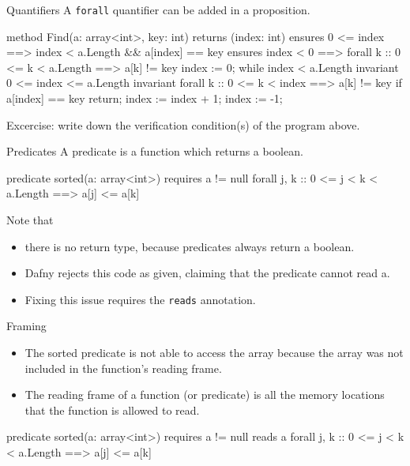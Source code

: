 \documentclass[10pt, compress]{beamer}
\begin{document}
\begin{frame}[fragile]{Quantifiers}
  A \verb|forall| quantifier can be added in a proposition.

  \begin{verbnobox}[\scriptsize]
method Find(a: array<int>, key: int) returns (index: int)
   ensures 0 <= index ==> index < a.Length && a[index] == key
   ensures index < 0 ==> forall k :: 0 <= k < a.Length ==> a[k] != key
{
   index := 0;
   while index < a.Length
      invariant 0 <= index <= a.Length
      invariant forall k :: 0 <= k < index ==> a[k] != key
   {
      if a[index] == key { return; }
      index := index + 1;
   }
   index := -1;
}
  \end{verbnobox}
  Excercise: write down the verification condition(s) of the program above.
\end{frame}

\begin{frame}[fragile]{Predicates}
  A predicate is a function which returns a boolean. 
  \begin{verbnobox}[\footnotesize]
predicate sorted(a: array<int>)
   requires a != null
{
   forall j, k :: 0 <= j < k < a.Length ==> a[j] <= a[k]
}
  \end{verbnobox}
Note that
  \begin{itemize}
  \item there is no return type, because predicates always return a boolean.
  \item Dafny rejects this code as given, claiming that the predicate cannot read a.
  \item Fixing this issue requires the \verb|reads| annotation.
  \end{itemize}
\end{frame}

\begin{frame}[fragile]{Framing}
  \begin{itemize}
  \item The sorted predicate is not able to access the array because the array was not included in the function's reading frame.
  \item The reading frame of a function (or predicate) is all the memory locations that the function is allowed to read. 
  \end{itemize}
  \begin{verbnobox}[\footnotesize]
predicate sorted(a: array<int>)
   requires a != null
   reads a
{
   forall j, k :: 0 <= j < k < a.Length ==> a[j] <= a[k]
}
  \end{verbnobox}
\end{frame}
\end{document}

